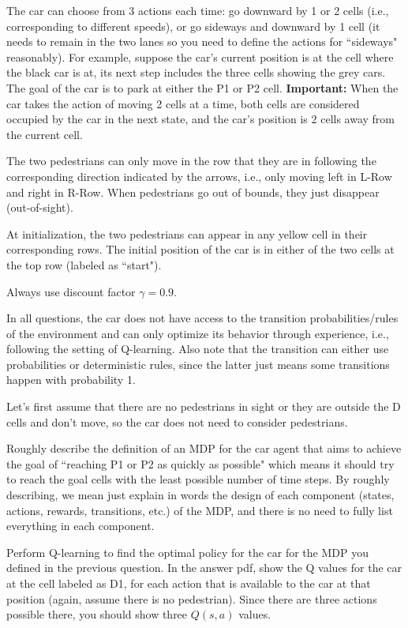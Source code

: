 \documentclass{article}
\begin{document}
The car can choose from 3 actions each time: go downward by 1 or 2 cells (i.e., corresponding to different speeds), or go sideways and downward by 1 cell (it needs to remain in the two lanes so you need to define the actions for ``sideways" reasonably). For example, suppose the car's current position is at the cell where the black car is at, its next step includes the three cells showing the grey cars. The goal of the car is to park at either the P1 or P2 cell. {\bf Important:} When the car takes the action of moving 2 cells at a time, both cells are considered occupied by the car in the next state, and the car's position is 2 cells away from the current cell. 

The two pedestrians can only move in the row that they are in following the corresponding direction indicated by the arrows, i.e., only moving left in L-Row and right in R-Row. When pedestrians go out of bounds, they just disappear (out-of-sight). 

At initialization, the two pedestrians can appear in any yellow cell in their corresponding rows. The initial position of the car is in either of the two cells at the top row (labeled as ``start"). 

Always use discount factor $\gamma=0.9$. 

In all questions, the car does not have access to the transition probabilities/rules of the environment and can only optimize its behavior through experience, i.e., following the setting of Q-learning. Also note that the transition can either use probabilities or deterministic rules, since the latter just means some transitions happen with probability 1. 

\begin{question}[2 Points]
Let's first assume that there are no pedestrians in sight or they are outside the D cells and don't move, so the car does not need to consider pedestrians. 

Roughly describe the definition of an MDP for the car agent that aims to achieve the goal of ``reaching P1 or P2 as quickly as possible" which means it should try to reach the goal cells with the least possible number of time steps. By roughly describing, we mean just explain in words the design of each component (states, actions, rewards, transitions, etc.) of the MDP, and there is no need to fully list everything in each component. 
\end{question}

\begin{question}[2 Points]
Perform Q-learning to find the optimal policy for the car for the MDP you defined in the previous question. In the answer pdf, show the Q values for the car at the cell labeled as D1, for each action that is available to the car at that position (again, assume there is no pedestrian). Since there are three actions possible there, you should show three $Q(s,a)$ values. 
\end{question}
\end{document}
